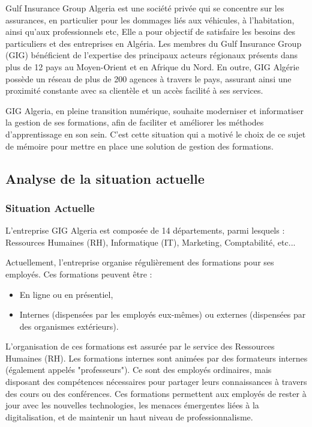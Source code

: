 \documentclass{article}
\begin{document}
\vspace{0,5cm}
\hspace*{1em}Gulf Insurance Group Algeria est une société privée qui se concentre sur les assurances, en particulier pour les dommages liés aux véhicules, à l'habitation, ainsi qu'aux professionnels etc, Elle a pour objectif de satisfaire les besoins des particuliers et des entreprises en Algéria. Les membres du Gulf Insurance Group (GIG) bénéficient de l'expertise des principaux acteurs régionaux présents dans plus de 12 pays au Moyen-Orient et en Afrique du Nord. En outre, GIG Algérie possède un réseau de plus de 200 agences à travers le pays, assurant ainsi une proximité constante avec sa clientèle et un accès facilité à ses services. \cite{GIG}

\vspace{0,3cm}


GIG Algeria, en pleine transition numérique, souhaite moderniser et informatiser la gestion de ses formations, afin de faciliter et améliorer les méthodes d’apprentissage en son sein.
 C'est cette situation qui a motivé le choix de ce sujet de mémoire pour mettre en place une solution de gestion des formations.


\subsection{Analyse de la situation actuelle}
\subsubsection{Situation Actuelle}

\vspace{0,3cm}
\hspace*{1em}L’entreprise GIG Algeria est composée de 14 départements, parmi lesquels : Ressources Humaines (RH), Informatique (IT), Marketing, Comptabilité, etc...

\vspace{0,3cm}
\noindent Actuellement, l’entreprise organise régulièrement des formations pour ses employés. Ces formations peuvent être :
\begin{itemize}
    \item En ligne ou en présentiel,
    \item Internes (dispensées par les employés eux-mêmes) ou externes (dispensées par des organismes extérieurs).
\end{itemize}
\vspace{0,3cm}
L’organisation de ces formations est assurée par le service des Ressources Humaines (RH).
Les formations internes sont animées par des formateurs internes (également appelés "professeurs"). Ce sont des employés ordinaires, mais disposant des compétences nécessaires pour partager leurs connaissances à travers des cours ou des conférences. Ces formations permettent aux employés de rester à jour avec les nouvelles technologies, les menaces émergentes liées à la digitalisation, et de maintenir un haut niveau de professionnalisme.
\end{document}
